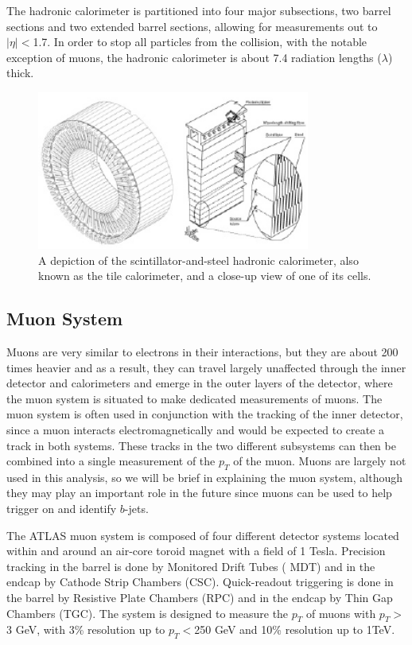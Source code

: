 The hadronic calorimeter is partitioned into four major subsections, two barrel sections and two extended barrel sections, allowing 
for measurements out to $|\eta|<$1.7.  In order to stop all particles from the collision, 
with the notable exception of muons, the hadronic calorimeter is about 7.4 radiation lengths ($\lambda$) thick.

\begin{figure}
	\includegraphics[width=0.8\textwidth]{ATLASDetector/images/tile_cal.pdf}
	\caption{A depiction of the scintillator-and-steel hadronic calorimeter, also known as the tile calorimeter, and a close-up view of one of its cells.	\label{fig:tile_cal}}
\end{figure}



\subsection{Muon System}
\label{sec:ms}
Muons are very similar to electrons in their interactions, but they are about 200 times heavier and as a 
result, they can travel largely unaffected through the inner detector and calorimeters and emerge in the outer layers of 
the detector, where the muon system is situated to make dedicated measurements of muons.  The muon system is 
often used in conjunction with the tracking of the inner detector, since a muon interacts electromagnetically and would be 
expected to create a track in both systems.  These tracks in the two different subsystems can then be combined 
into a single measurement of the $p_T$ of the muon.  Muons are largely not used 
in this analysis, so we will be brief in explaining the muon system, although they may play an 
important role in the future since muons can be used to help trigger on and identify $b$-jets.


The ATLAS muon system is composed of four different detector systems located within and around an air-core toroid 
magnet with a field of 1 Tesla.  Precision tracking in the barrel is done by Monitored Drift Tubes (
MDT) and in the endcap by Cathode Strip Chambers (CSC).  Quick-readout triggering is done in 
the barrel by Resistive Plate Chambers (RPC) and in the endcap by Thin Gap Chambers (TGC).   
The system is designed to measure the $p_T$ of muons with $p_T>$
3 GeV, with 3\% resolution up to $p_T<$250 GeV and 10\% resolution up to 1TeV.  



